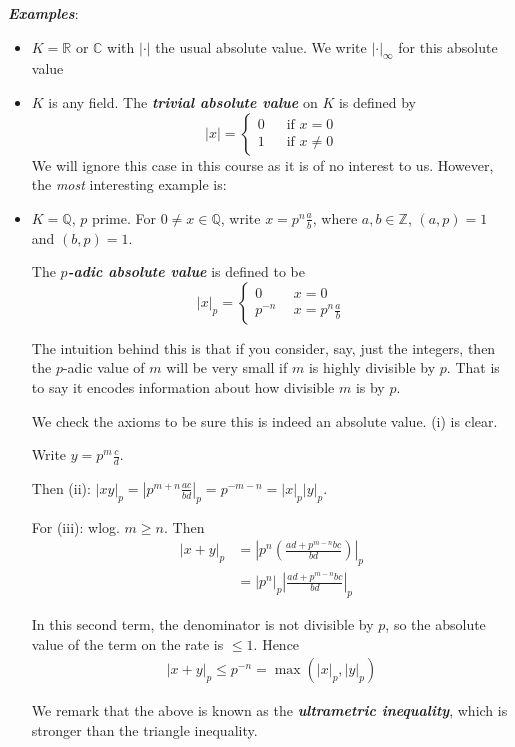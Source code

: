 \documentclass[]{article}
\theoremstyle{custhm}
\theoremstyle{cusdef}
\theoremstyle{custhm}
\theoremstyle{custhm}
\theoremstyle{custhm}
\theoremstyle{custhm}
\theoremstyle{cusdef}
\theoremstyle{remark}
\newcommand{\Z}{\mathbb{Z}}
\newcommand{\Q}{\mathbb{Q}}
\newcommand{\R}{\mathbb{R}}
\newcommand{\C}{\mathbb{C}}
\newcommand{\undf}[1]{\textit{\textbf{#1}}}
\renewcommand{\it}[1]{\textit{#1}}
\begin{document}
\undf{Examples}:
\begin{itemize}
	\item $K = \R$ or $\C$ with $|\cdot|$ the usual absolute value. We write $|\cdot|_{\infty}$ for this absolute value
	\item $K$ is any field. The \undf{trivial absolute value} on $K$ is defined by \[|x| = \left\{\begin{array}{cc}0&\ \ \textrm{ if }x = 0\\ 1&\ \ \textrm{ if }x\ne 0\end{array}\right.
	\]
	We will ignore this case in this course as it is of no interest to us. However, the \it{most} interesting example is:
	\item $K = \Q$, $p$ prime. For $0\ne x\in \Q$, write $x = p^n\frac{a}{b}$, where $a,b\in\Z$, $(a,p) = 1$ and $(b,p) = 1$.
	
	The \undf{$p$-adic absolute value} is defined to be
	\[
	|x|_p = \left\{\begin{array}{cc}0 &\ \ x = 0\\ p^{-n}&\ \ x = p^n\frac{a}{b}\end{array}    \right.
	\]
	
	The intuition behind this is that if you consider, say, just the integers, then the $p$-adic value of $m$ will be very small if $m$ is highly divisible by $p$. That is to say it encodes information about how divisible $m$ is by $p$.
	
	We check the axioms to be sure this is indeed an absolute value. (i) is clear.
	
	Write $y = p^m\frac{c}{d}$.
	
	Then (ii): $|xy|_p = \left|p^{m+n}\frac{ac}{bd}\right|_p = p^{-m-n} = |x|_p|y|_p$.
	
	For (iii): wlog. $m\ge n$. Then 
	\begin{align*}
	|x+y|_p &= \left|p^n\left(\frac{ad+p^{m-n}bc}{bd}\right)\right|_p\\
	&= |p^n|_p\left|\frac{ad+p^{m-n}bc}{bd}\right|_p
	\end{align*}

	In this second term, the denominator is not divisible by $p$, so the absolute value of the term on the rate is $\le 1$. Hence
	\begin{align*}
		|x+y|_p \le p^{-n} = \max(|x|_p,|y|_p)
	\end{align*}

	We remark that the above is known as the \undf{ultrametric inequality}, which is stronger than the triangle inequality.
\end{itemize}
\end{document}
